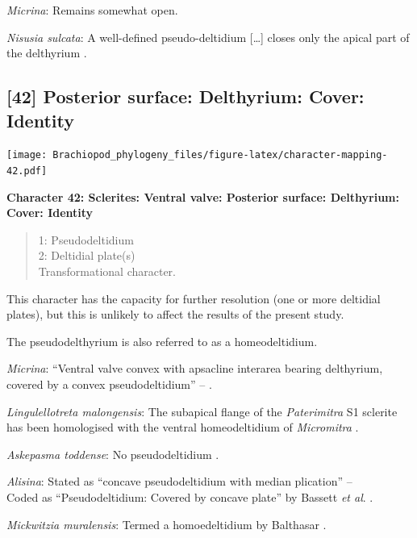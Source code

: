 \documentclass[]{book}
\theoremstyle{definition}
\theoremstyle{definition}
\theoremstyle{definition}
\theoremstyle{remark}
\begin{document}
\emph{Micrina}: Remains somewhat open.

\emph{Nisusia sulcata}: A well-defined pseudo-deltidium {[}\ldots{}{]}
closes only the apical part of\\
the delthyrium \citep{Rowell1985Theevolutionary}.

\hypertarget{posterior-surface-delthyrium-cover-identity}{%
\subsection*{{[}42{]} Posterior surface: Delthyrium: Cover:
Identity}\label{posterior-surface-delthyrium-cover-identity}}

\texttt{[image: Brachiopod\_phylogeny\_files/figure-latex/character-mapping-42.pdf]}

\textbf{Character 42: Sclerites: Ventral valve: Posterior surface:
Delthyrium: Cover: Identity}

\begin{quote}
1: Pseudodeltidium\\
2: Deltidial plate(s)\\
Transformational character.
\end{quote}

This character has the capacity for further resolution (one or more
deltidial plates), but this is unlikely to affect the results of the
present study.

The pseudodelthyrium is also referred to as a homeodeltidium.

\emph{Micrina}: ``Ventral valve convex with apsacline interarea bearing
delthyrium, covered by a convex pseudodeltidium'' --
\citet{Holmer2008TheEarly}.

\emph{Lingulellotreta malongensis}: The subapical flange of the
\emph{Paterimitra} S1 sclerite has been homologised with the ventral
homeodeltidium of \emph{Micromitra} \citep{Larsson2014iPaterimitra}.

\emph{Askepasma toddense}: No pseudodeltidium
\citep[p.~153]{Williams2000BrachiopodaLinguliformea}.

\emph{Alisina}: Stated as ``concave pseudodeltidium with median
plication'' -- \citet{Williams2000BrachiopodaLinguliformea}\\
Coded as ``Pseudodeltidium: Covered by concave plate'' by Bassett
\emph{et al}. \citeyearpar{Bassett2001Functionalmorphology}.

\emph{Mickwitzia muralensis}: Termed a homoedeltidium by Balthasar
\citeyearpar{Balthasar2004Shellstructure}.
\end{document}
